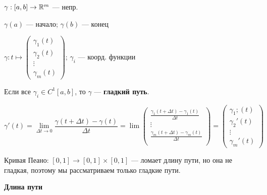 $\gamma:[a,b]\to\mathbb{R}^m$ --- непр.

$\gamma(a)$ --- начало; $\gamma(b)$ --- конец

$\gamma:t\mapsto \begin{pmatrix}
    \gamma_1(t) \\
    \gamma_2(t) \\
    \vdots \\
    \gamma_m(t)
\end{pmatrix}$; $\gamma_i$ --- коорд. функции

Если все $\gamma_i\in C^1 [a,b]$, то $\gamma$ --- \textbf{гладкий путь}.

$$\gamma'(t)=\lim\limits_{\Delta t\to0}\frac{\gamma(t+\Delta t)-\gamma(t)}{\Delta t}=\lim \begin{pmatrix}
    \frac{\gamma_1(t+\Delta t)-\gamma_1(t)}{\Delta t} \\
    \vdots \\
    \frac{\gamma_m(t+\Delta t)-\gamma_m(t)}{\Delta t} \\
\end{pmatrix}=\begin{pmatrix}
    \gamma_1;(t) \\
    \gamma_2'(t) \\
    \vdots \\
    \gamma_m'(t)
\end{pmatrix}$$

Кривая Пеано: $[0,1]\to[0,1]\times[0,1]$ --- ломает длину пути, но она не гладкая, поэтому мы рассматриваем только гладкие пути.

\begin{definition}
    \textbf{Длина пути}
\end{definition}

